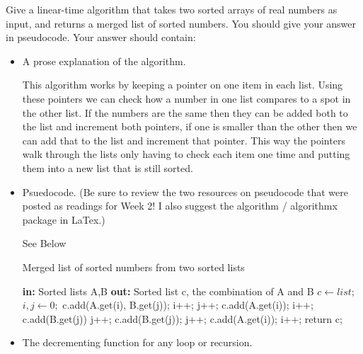 \documentclass{article}
\author{Peter Gifford, Ren Wall, Kyle Brekke, Madison Hanson Group: 7}
\date{due: 20 September 2019}
\begin{document}
\nextprob
Give a linear-time algorithm that takes two sorted arrays of real numbers as
input, and returns a merged list of sorted numbers.  You should give your answer
in pseudocode.    Your answer should contain:
\begin{itemize}
    \item A prose explanation of the algorithm.
    
     This algorithm works by keeping a pointer on one item in each list. Using these pointers we can check how a number in one list compares to a spot in the other list. If the numbers are the same then they can be added both to the list and increment both pointers, if one is smaller than the other then we can add that to the list and increment that pointer. This way the pointers walk through the lists only having to check each item one time and putting them into a new list that is still sorted.
     
    \item Psuedocode. (Be sure to review the two resources on pseudocode that were
        posted as readings for Week 2!  I also suggest the algorithm /
        algorithmx package in LaTex.)
        
        See Below
        
         \begin{algorithm}
        \caption{Merged list of sorted numbers from two sorted lists}\label{sorted list}
        \begin{algorithmic}[1]
        		\State \textbf{in:}  Sorted lists A,B
		\State \textbf{out:}  Sorted list c, the combination of A and B
        		\State $c\gets list;$
		\State $i, j\gets 0;$
				\State c.add(A.get(i), B.get(j));
				\State i++;
				\State j++;
				\State c.add(A.get(i));
				\State i++;
				\State c.add(B.get(j))
				\State j++;
			\EndIf
		\EndWhile
				\State c.add(B.get(j));
				\State j++;
			\EndWhile
		\EndIf
				\State c.add(A.get(i));
				\State i++;
			\EndWhile
		\EndIf
		\State return c;
	\EndProcedure
	\end{algorithmic}
	\end{algorithm}
        
    \item The decrementing function for any loop or recursion.
    

\end{itemize}
\end{document}
